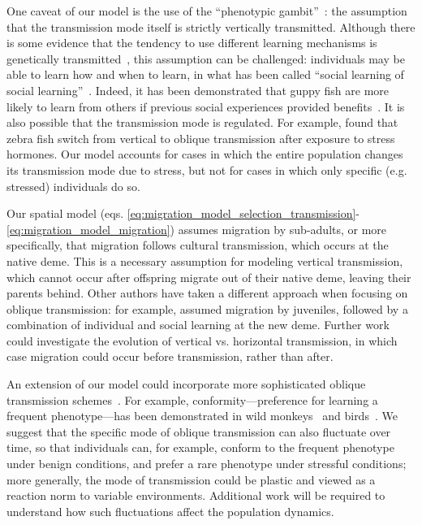 \documentclass[14pt]{extarticle}
\begin{document}
One caveat of our model is the use of the ``phenotypic gambit''~\citep{Grafen1984}: the assumption that the transmission mode itself is strictly vertically transmitted.
Although there is some evidence that the tendency to use different learning mechanisms is genetically transmitted~\citep{Foucaud2013}, this assumption can be challenged: individuals may be able to learn how and when to learn, in what has been called ``social learning of social learning''~\citep{Mesoudi2016}.
Indeed, it has been demonstrated that guppy fish are more likely to learn from others if previous social experiences provided benefits~\citep{Leris2016}.
It is also possible that the transmission mode is regulated.
For example, \citet{Farine2015} found that zebra fish switch from vertical to oblique transmission after exposure to stress hormones.
Our model accounts for cases in which the entire population changes its transmission mode due to stress, but not for cases in which only specific (e.g. stressed) individuals do so.

Our spatial model (eqs. \ref{eq:migration_model_selection_transmission}-\ref{eq:migration_model_migration}) assumes migration by sub-adults, or more specifically, that migration follows cultural transmission, which occurs at the native deme. 
This is a necessary assumption for modeling vertical transmission, which cannot occur after offspring migrate out of their native deme, leaving their parents behind.
Other authors have taken a different approach when focusing on oblique transmission: for example, \citet{Kobayashi2012} assumed migration by juveniles, followed by a combination of individual and social learning at the new deme.
Further work could investigate the evolution of vertical vs. horizontal transmission, in which case migration could occur before transmission, rather than after.


An extension of our model could incorporate more sophisticated oblique transmission schemes~\citep[][Figure~3]{Creanza2017}.
For example, conformity---preference for learning a frequent phenotype---has been demonstrated in wild monkeys~\citep{VanDeWaal2013} and birds~\citep{Aplin2015}.
We suggest that the specific mode of oblique transmission can also fluctuate over time, so that individuals can, for example, conform to the frequent phenotype under benign conditions, and prefer a rare phenotype under stressful conditions; more generally, the mode of transmission could be plastic and viewed as a reaction norm to variable environments.
Additional work will be required to understand how such fluctuations affect the population dynamics. 
\end{document}
